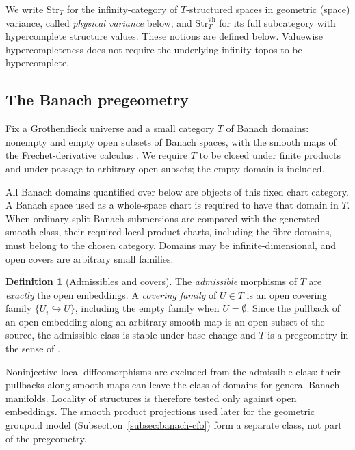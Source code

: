 \documentclass[12pt]{amsart}
\theoremstyle{definition}
\newtheorem{defn}[thm]{Definition}
\theoremstyle{remark}
\numberwithin{equation}{section}
\begin{document}
We write $\mathrm{Str}_T$ for the infinity-category of
$T$-structured spaces in geometric (space) variance, called
\emph{physical variance} below, and $\mathrm{Str}_T^{\mathrm{vh}}$
for its full subcategory with hypercomplete structure values.
These notions are defined below. Valuewise hypercompleteness
does not require the underlying infinity-topos to be hypercomplete.

\subsection{The Banach pregeometry}
\label{subsec:banach-pregeometry}

Fix a Grothendieck universe and a small category $T$ of Banach
domains: nonempty and empty open subsets of Banach spaces, with the
smooth maps of the Frechet-derivative calculus
\cite{Schmeding2021}. We require $T$ to be closed under
finite products and under passage to arbitrary open subsets; the
empty domain is included.

All Banach domains quantified over below are objects of this
fixed chart category. A Banach space used as a whole-space
chart is required to have that domain in $T$.
When ordinary split Banach submersions are compared with the
generated smooth class, their required local product charts,
including the fibre domains, must belong to the chosen
category. Domains may be infinite-dimensional, and open
covers are arbitrary small families.

\begin{defn}[Admissibles and covers]
\label{defn:banach-pregeometry}
The \emph{admissible} morphisms of $T$ are \emph{exactly} the open
embeddings. A \emph{covering family} of $U\in T$ is an open covering
family $\{U_i\hookrightarrow U\}$, including the empty family when
$U=\emptyset$. Since the pullback of an open embedding
along an arbitrary smooth map is an open subset of the source, the
admissible class is stable under base change and $T$ is a
pregeometry in the sense of
\cite[Definition~3.1.1]{LurieDAGV2009}.
\end{defn}

Noninjective local diffeomorphisms are excluded from the
admissible class: their pullbacks along smooth maps can leave the class of
domains for general Banach manifolds. Locality of structures is
therefore tested only against open embeddings. The smooth product
projections used later for the geometric groupoid model
(Subsection~\ref{subsec:banach-cfo}) form a separate class, not part
of the pregeometry.
\end{document}
